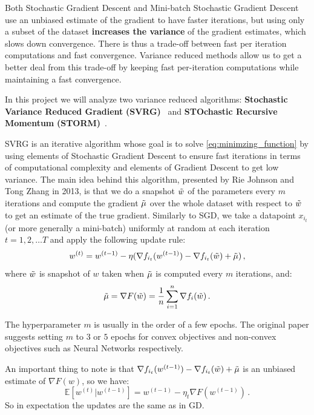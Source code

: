 \documentclass[a4paper,11pt,oneside]{report}
\begin{document}
Both Stochastic Gradient Descent and Mini-batch Stochastic Gradient Descent use an unbiased estimate of the gradient to have faster iterations, but using only a subset of the dataset \textbf{increases the variance} of the gradient estimates, which slows down convergence. There is thus a trade-off between fast per iteration computations and fast convergence. Variance reduced methods allow us to get a better deal from this trade-off by keeping fast per-iteration computations while maintaining a fast convergence.

In this project we will analyze two variance reduced algorithms: \textbf{Stochastic Variance Reduced Gradient} \textbf{(SVRG)}~\cite{NIPS2013_ac1dd209} and \textbf{STOchastic Recursive Momentum} \textbf{(STORM)}~\cite{Cutkosky2019storm}. 

SVRG is an iterative algorithm whose goal is to solve \autoref{eq:minimzing_function} by using elements of Stochastic Gradient Descent to ensure fast iterations in terms of computational complexity and elements of Gradient Descent to get low variance. The main idea behind this algorithm, presented by Rie Johnson and Tong Zhang in 2013, is that we do a snapshot $\Tilde{w}$ of the parameters every $m$ iterations and compute the gradient $\Tilde{\mu}$ over the whole dataset with respect to $\Tilde{w}$ to get an estimate of the true gradient. Similarly to SGD, we take a datapoint $x_{i_t}$(or more generally a mini-batch) uniformly at random at each iteration $t=1,2,\dots T$ and apply the following update rule:
\begin{equation}\label{eq:updateSVRG}
    w^{(t)} = w^{(t-1)} -\eta(\nabla f_{i_t}(w^{(t-1)}) - \nabla f_{i_t}(\Tilde{w}) + \Tilde{\mu})\,,
\end{equation}
where $\Tilde{w}$ is snapshot of $w$ taken when $\Tilde{\mu}$ is computed every $m$ iterations, and:
\begin{equation}\label{eq:snapshotGradientSVRG}
    \Tilde{\mu} = \nabla F(\Tilde{w}) = \frac{1}{n}\sum_{i=1}^n \nabla f_i(\Tilde{w})\,.
\end{equation}

The hyperparameter $m$ is usually in the order of a few epochs. The original paper suggests setting $m$ to $3$ or $5$ epochs for convex objectives and non-convex objectives such as Neural Networks respectively. 

An important thing to note is that $\nabla f_{i_t}(w^{(t-1)}) - \nabla f_{i_t}(\Tilde{w}) + \Tilde{\mu}$ is an unbiased estimate of $\nabla F(w)$, so we have:
\begin{equation}
    \mathbb{E}[w^{(t)} | w^{(t-1)}] = w^{(t-1)}-\eta_t \nabla F(w^{(t-1)})\,.
\end{equation}
So in expectation the updates are the same as in GD. 
\end{document}
